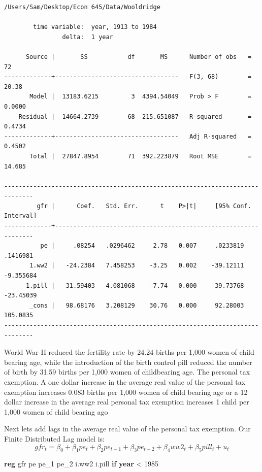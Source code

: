 \documentclass[
]{book}
\newenvironment{Shaded}{\begin{snugshade}}{\end{snugshade}}
\newcommand{\FunctionTok}[1]{\textcolor[rgb]{0.13,0.29,0.53}{\textbf{#1}}}
\newcommand{\KeywordTok}[1]{\textcolor[rgb]{0.13,0.29,0.53}{\textbf{#1}}}
\newcommand{\NormalTok}[1]{#1}
\begin{document}
\begin{verbatim}
/Users/Sam/Desktop/Econ 645/Data/Wooldridge

        time variable:  year, 1913 to 1984
                delta:  1 year

      Source |       SS           df       MS      Number of obs   =        72
-------------+----------------------------------   F(3, 68)        =     20.38
       Model |  13183.6215         3  4394.54049   Prob > F        =    0.0000
    Residual |  14664.2739        68  215.651087   R-squared       =    0.4734
-------------+----------------------------------   Adj R-squared   =    0.4502
       Total |  27847.8954        71  392.223879   Root MSE        =    14.685

------------------------------------------------------------------------------
         gfr |      Coef.   Std. Err.      t    P>|t|     [95% Conf. Interval]
-------------+----------------------------------------------------------------
          pe |     .08254   .0296462     2.78   0.007     .0233819    .1416981
       1.ww2 |   -24.2384   7.458253    -3.25   0.002    -39.12111   -9.355684
      1.pill |  -31.59403   4.081068    -7.74   0.000    -39.73768   -23.45039
       _cons |   98.68176   3.208129    30.76   0.000     92.28003    105.0835
------------------------------------------------------------------------------
\end{verbatim}

World War II reduced the fertility rate by 24.24 births per 1,000 women of
child bearing age, while the introduction of the birth control pill reduced
the number of birth by 31.59 births per 1,000 women of childbearing age.
The personal tax exemption. A one dollar increase in the average real value of
the personal tax exemption increases 0.083 births per 1,000 women of child
bearing age or a 12 dollar increase in the average real personal
tax exemption increases 1 child per 1,000 women of child bearing ago

Next lets add lags in the average real value of the personal tax exemption.
Our Finite Distributed Lag model is:
\[ gfr_t=\beta_0 + \beta_1 pe_t + \beta_2 pe_{t-1} + \beta_3 pe_{t-2} + \beta_4 ww2_t + \beta_5 pill_t + u_t \]

\begin{Shaded}
\begin{Highlighting}[]
\KeywordTok{reg}\NormalTok{ gfr pe pe\_1 pe\_2 i.ww2 i.pill }\KeywordTok{if} \FunctionTok{year}\NormalTok{ \textless{} 1985}
\end{Highlighting}
\end{Shaded}
\end{document}
